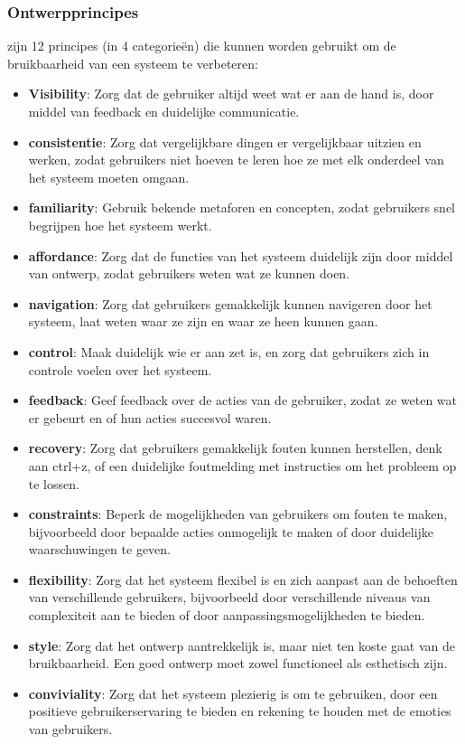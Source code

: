\documentclass[nonacm, sigconf, balance=true]{acmart}
\begin{document}
    \subsubsection{Ontwerpprincipes} zijn 12 principes (in 4 categorieën) die kunnen worden gebruikt om de bruikbaarheid van een systeem te verbeteren:

    \begin{itemize}
        \item \textbf{Visibility}: Zorg dat de gebruiker altijd weet wat er aan de hand is, door middel van feedback en duidelijke communicatie.
        \item \textbf{consistentie}: Zorg dat vergelijkbare dingen er vergelijkbaar uitzien en werken, zodat gebruikers niet hoeven te leren hoe ze met elk onderdeel van het systeem moeten omgaan.
        \item \textbf{familiarity}: Gebruik bekende metaforen en concepten, zodat gebruikers snel begrijpen hoe het systeem werkt.
        \item \textbf{affordance}: Zorg dat de functies van het systeem duidelijk zijn door middel van ontwerp, zodat gebruikers weten wat ze kunnen doen.
        \item \textbf{navigation}: Zorg dat gebruikers gemakkelijk kunnen navigeren door het systeem, laat weten waar ze zijn en waar ze heen kunnen gaan.
        \item \textbf{control}: Maak duidelijk wie er aan zet is, en zorg dat gebruikers zich in controle voelen over het systeem.
        \item \textbf{feedback}: Geef feedback over de acties van de gebruiker, zodat ze weten wat er gebeurt en of hun acties succesvol waren.
        \item \textbf{recovery}: Zorg dat gebruikers gemakkelijk fouten kunnen herstellen, denk aan ctrl+z, of een duidelijke foutmelding met instructies om het probleem op te lossen.
        \item \textbf{constraints}: Beperk de mogelijkheden van gebruikers om fouten te maken, bijvoorbeeld door bepaalde acties onmogelijk te maken of door duidelijke waarschuwingen te geven.
        \item \textbf{flexibility}: Zorg dat het systeem flexibel is en zich aanpast aan de behoeften van verschillende gebruikers, bijvoorbeeld door verschillende niveaus van complexiteit aan te bieden of door aanpassingsmogelijkheden te bieden.
        \item \textbf{style}: Zorg dat het ontwerp aantrekkelijk is, maar niet ten koste gaat van de bruikbaarheid.
        Een goed ontwerp moet zowel functioneel als esthetisch zijn.
        \item \textbf{conviviality}: Zorg dat het systeem plezierig is om te gebruiken, door een positieve gebruikerservaring te bieden en rekening te houden met de emoties van gebruikers.
    \end{itemize}
\end{document}
